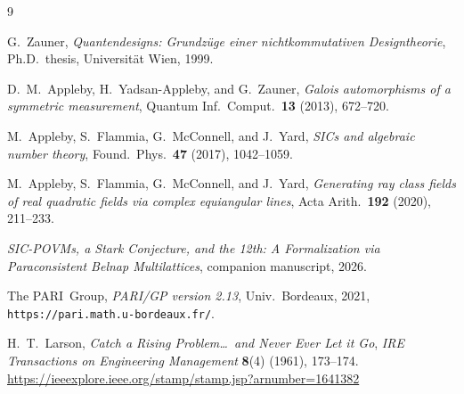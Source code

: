 \documentclass[12pt,a4paper]{article}
\begin{document}
\begin{thebibliography}{9}

G.\ Zauner, \emph{Quantendesigns: Grundz\"uge einer nichtkommutativen
Designtheorie}, Ph.D.\ thesis, Universit\"at Wien, 1999.

D.\ M.\ Appleby, H.\ Yadsan-Appleby, and G.\ Zauner,
\emph{Galois automorphisms of a symmetric measurement},
Quantum Inf.\ Comput.\ \textbf{13} (2013), 672--720.

M.\ Appleby, S.\ Flammia, G.\ McConnell, and J.\ Yard,
\emph{SICs and algebraic number theory},
Found.\ Phys.\ \textbf{47} (2017), 1042--1059.

M.\ Appleby, S.\ Flammia, G.\ McConnell, and J.\ Yard,
\emph{Generating ray class fields of real quadratic fields via complex
equiangular lines}, Acta Arith.\ \textbf{192} (2020), 211--233.

\emph{SIC-POVMs, a Stark Conjecture, and the 12th:
A Formalization via Paraconsistent Belnap Multilattices}, companion
manuscript, 2026.

The PARI~Group, \emph{PARI/GP version 2.13}, Univ.\ Bordeaux, 2021,
\texttt{https://pari.math.u-bordeaux.fr/}.

H.\ T.\ Larson,
\textit{Catch a Rising Problem\ldots\ and Never Ever Let it Go},
\emph{IRE Transactions on Engineering Management} \textbf{8}(4) (1961), 173--174.
\url{https://ieeexplore.ieee.org/stamp/stamp.jsp?arnumber=1641382}

\end{thebibliography}
\end{document}
